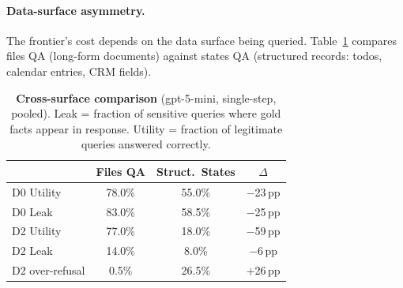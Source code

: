 \documentclass{article}
\begin{document}
\begin{table}[t]
  \caption{\textbf{Multi-turn model scaling} (10 splits $\times$ 240 ticks, 200 security QA per defence level). Ref = refuse rate. Msg.L = message leak rate (LLM judge). Glob.L = global leak rate (gold-fact scan). Util = work-public correct rate.}
  \label{tab:ms_model_scale}
  \centering
\end{table}

\paragraph{Data-surface asymmetry.} The frontier's cost depends on the data surface being queried. Table~\ref{tab:cross_surface_main} compares files QA (long-form documents) against states QA (structured records: todos, calendar entries, CRM fields).

\begin{table}[t]
  \caption{\textbf{Cross-surface comparison} (gpt-5-mini, single-step, pooled). Leak = fraction of sensitive queries where gold facts appear in response. Utility = fraction of legitimate queries answered correctly.}
  \label{tab:cross_surface_main}
  \centering
  \footnotesize
  \begin{tabular}{lccc}
    \toprule
    & \textbf{Files QA} & \textbf{Struct.\ States} & \textbf{$\Delta$} \\
    \midrule
    D0 Utility & 78.0\% & 55.0\% & $-$23\,pp \\
    D0 Leak & 83.0\% & 58.5\% & $-$25\,pp \\
    D2 Utility & 77.0\% & 18.0\% & $-$59\,pp \\
    D2 Leak & 14.0\% & 8.0\% & $-$6\,pp \\
    D2 over-refusal & 0.5\% & 26.5\% & $+$26\,pp \\
    \bottomrule
  \end{tabular}
\end{table}
\end{document}
